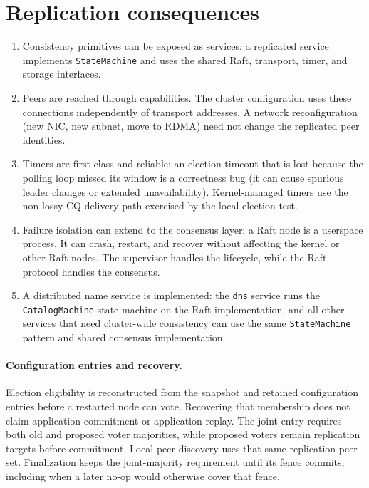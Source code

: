\section{Replication consequences}

\begin{enumerate}
    \item Consistency primitives can be exposed as services: a replicated
        service implements \texttt{StateMachine} and uses the shared Raft,
        transport, timer, and storage interfaces.

    \item Peers are reached through capabilities. The cluster configuration
        uses these connections independently of transport addresses.
        A network reconfiguration (new NIC, new subnet, move to RDMA)
        need not change the replicated peer identities.

    \item Timers are first-class and reliable: an election timeout
        that is lost because the polling loop missed its window is a correctness
        bug (it can cause spurious leader changes or extended unavailability).
        Kernel-managed timers use the non-lossy CQ delivery path exercised by
        the local-election test.

    \item Failure isolation can extend to the consensus layer: a Raft
        node is a userspace process. It can crash, restart, and recover without
        affecting the kernel or other Raft nodes. The supervisor handles the
        lifecycle, while the Raft protocol handles the consensus.

    \item A distributed name service is implemented: the
        \texttt{dns} service runs the \texttt{CatalogMachine} state machine
        on the Raft implementation, and all other services that need cluster-wide
        consistency can use the same \texttt{StateMachine} pattern and shared
        consensus implementation.
\end{enumerate}

\paragraph{Configuration entries and recovery.}
Election eligibility is reconstructed from the snapshot and retained configuration
entries before a restarted node can vote.  Recovering that membership does not
claim application commitment or application replay.  The joint entry requires both
old and proposed voter majorities, while proposed voters remain replication targets
before commitment.  Local peer discovery uses that same replication peer set.
Finalization keeps the joint-majority requirement until its
fence commits, including when a later no-op would otherwise cover that fence.


